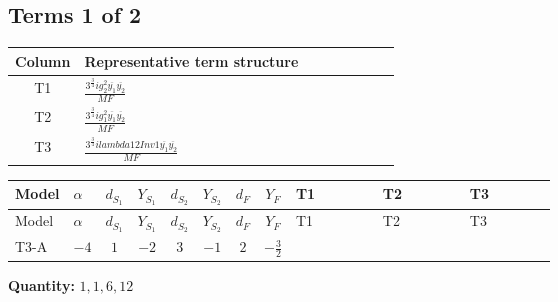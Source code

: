 \documentclass[8pt]{article}
\begin{document}
\begin{landscape}
\subsection*{Terms 1 of 2}
\begin{center}
\begin{tabular}{@{}c >{\raggedright\arraybackslash}p{0.82\linewidth}@{}}
\toprule
Column & Representative term structure \\
\midrule
T1 & \(\displaystyle \frac{3^{\frac{3}{4}} i g_{2}^{2} \overline{y_{1}} \overline{y_{2}}}{MF}\) \\
\midrule
T2 & \(\displaystyle \frac{3^{\frac{3}{4}} i g_{1}^{2} \overline{y_{1}} \overline{y_{2}}}{MF}\) \\
\midrule
T3 & \(\displaystyle \frac{3^{\frac{3}{4}} i lambda12Inv1 \overline{y_{1}} \overline{y_{2}}}{MF}\) \\
\midrule
\bottomrule
\end{tabular}
\end{center}
\smallskip
\tiny
\begin{longtable}{@{}llcccccc >{\raggedright\arraybackslash}p{0.21\linewidth} >{\raggedright\arraybackslash}p{0.21\linewidth} >{\raggedright\arraybackslash}p{0.21\linewidth}@{}}
\toprule
Model & $\alpha$ & $d_{S_1}$ & $Y_{S_1}$ & $d_{S_2}$ & $Y_{S_2}$ & $d_F$ & $Y_F$ & T1 & T2 & T3 \\
\midrule
\endfirsthead
\toprule
Model & $\alpha$ & $d_{S_1}$ & $Y_{S_1}$ & $d_{S_2}$ & $Y_{S_2}$ & $d_F$ & $Y_F$ & T1 & T2 & T3 \\
\midrule
\endhead
T3-A & $-4$ & $1$ & $-2$ & $3$ & $-1$ & $2$ & $-\frac{3}{2}$ & \scriptsize\adjustbox{max width=\linewidth}{$\begin{gathered} - \frac{17 \cdot 3^{\frac{3}{4}} i g_{2}^{2} \overline{y_{1}} \overline{y_{2}}}{24 MF}\end{gathered}$} & \scriptsize\adjustbox{max width=\linewidth}{$\begin{gathered} - \frac{9 \cdot 3^{\frac{3}{4}} i g_{1}^{2} \overline{y_{1}} \overline{y_{2}}}{8 MF}\end{gathered}$} & \scriptsize\adjustbox{max width=\linewidth}{$\begin{gathered} - \frac{3^{\frac{3}{4}} i lambda12Inv1 \overline{y_{1}} \overline{y_{2}}}{6 MF}\end{gathered}$} \\
\midrule
\bottomrule
\end{longtable}
\clearpage
\noindent\textbf{Quantity: }$\mathrm{1,1,6,12}$\par\smallskip

\end{landscape}
\end{document}
